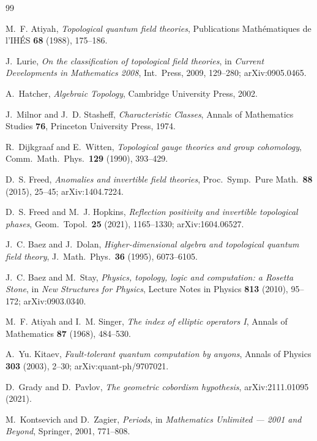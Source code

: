 \documentclass[12pt]{article}
\theoremstyle{definition}
\theoremstyle{remark}
\begin{document}
\begin{thebibliography}{99}

M.~F. Atiyah,
\emph{Topological quantum field theories},
Publications Math\'ematiques de l'IH\'ES \textbf{68} (1988), 175--186.

J.~Lurie,
\emph{On the classification of topological field theories},
in \emph{Current Developments in Mathematics 2008}, Int.\ Press, 2009, 129--280;
arXiv:0905.0465.

A.~Hatcher,
\emph{Algebraic Topology},
Cambridge University Press, 2002.

J.~Milnor and J.~D. Stasheff,
\emph{Characteristic Classes},
Annals of Mathematics Studies \textbf{76}, Princeton University Press, 1974.

R.~Dijkgraaf and E.~Witten,
\emph{Topological gauge theories and group cohomology},
Comm.\ Math.\ Phys.\ \textbf{129} (1990), 393--429.

D.~S. Freed,
\emph{Anomalies and invertible field theories},
Proc.\ Symp.\ Pure Math.\ \textbf{88} (2015), 25--45; arXiv:1404.7224.

D.~S. Freed and M.~J. Hopkins,
\emph{Reflection positivity and invertible topological phases},
Geom.\ Topol.\ \textbf{25} (2021), 1165--1330; arXiv:1604.06527.

J.~C. Baez and J.~Dolan,
\emph{Higher-dimensional algebra and topological quantum field theory},
J.\ Math.\ Phys.\ \textbf{36} (1995), 6073--6105.

J.~C. Baez and M.~Stay,
\emph{Physics, topology, logic and computation: a Rosetta Stone},
in \emph{New Structures for Physics}, Lecture Notes in Physics \textbf{813}
(2010), 95--172; arXiv:0903.0340.

M.~F. Atiyah and I.~M. Singer,
\emph{The index of elliptic operators I},
Annals of Mathematics \textbf{87} (1968), 484--530.

A.~Yu. Kitaev,
\emph{Fault-tolerant quantum computation by anyons},
Annals of Physics \textbf{303} (2003), 2--30; arXiv:quant-ph/9707021.

D.~Grady and D.~Pavlov,
\emph{The geometric cobordism hypothesis},
arXiv:2111.01095 (2021).

M.~Kontsevich and D.~Zagier,
\emph{Periods},
in \emph{Mathematics Unlimited --- 2001 and Beyond}, Springer, 2001, 771--808.

\end{thebibliography}
\end{document}
